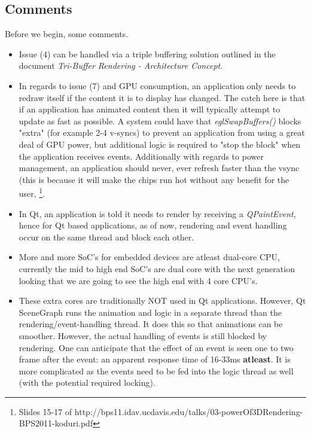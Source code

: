 \documentclass[a4paper,11pt]{article}
\begin{document}
\subsection{Comments}
\begin{indenter}{2cm}

Before we begin, some comments.
\begin{itemize}
\item Issue (4) can be handled via a triple buffering solution outlined in  
the document \textit{Tri-Buffer Rendering - Architecture Concept}.
\item In regards to issue (7) and GPU consumption, an application only needs
to redraw itself if the content it is to display has changed. The catch
here is that if an application has animated content then it will typically
attempt to update as fast as possible. A system could have that \textit{eglSwapBuffers()}
blocks "extra" (for example 2-4 v-syncs) to prevent an application from
using a great deal of GPU power, but additional logic is required to 
"stop the block" when the application receives events. Additionally with 
regards to power management, an application should never, ever refresh faster
than the vsync (this is because it will make the chips run hot without any benefit for the user, \footnote{Slides 15-17 of
http://bps11.idav.ucdavis.edu/talks/03-powerOf3DRendering-BPS2011-koduri.pdf}.
\item In Qt, an application is told it needs to render by receiving a \textit{QPaintEvent},
hence for Qt based applications, as of now, rendering and event handling
occur on the same thread and block each other.
\item More and more SoC's for embedded devices are atleast dual-core CPU, 
currently the mid to high end SoC's are dual core with the next generation 
looking that we are going to see the high end with 4 core CPU's.
\item These extra cores are traditionally NOT used in Qt applications. However,
Qt SceneGraph runs the animation and logic in a separate thread than
the rendering/event-handling thread. It does this so that animations can
be smoother. However, the actual handling of events is still blocked
by rendering. One can anticipate that the effect of an event is seen
one to two frame after the event: an apparent response time of 16-33ms
\textbf{atleast}. It is more complicated as the events need to be fed into 
the logic thread as well (with the potential required locking). 
\end{itemize}

\end{indenter}
\end{document}
